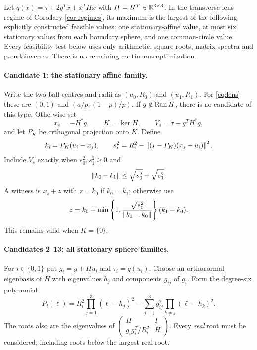 \begin{theorem}\label{thm:fourteen}
Let $q(x)=\tau+2g^Tx+x^THx$ with $H=H^T\in\mathbb R^{3\times3}$.
In the transverse lens regime of Corollary \ref{cor:regimes}, its maximum
is the largest of the following explicitly constructed feasible values:
one stationary-affine value, at most six stationary values from each
boundary sphere, and one common-circle value. Every feasibility test below
uses only arithmetic, square roots, matrix spectra and pseudoinverses.
There is no remaining continuous optimization.
\end{theorem}

\paragraph{Candidate 1: the stationary affine family.}
Write the two ball centres and radii as $(u_0,R_0)$ and $(u_1,R_1)$.
For \eqref{eq:lens} these are $(0,1)$ and $(a/p,(1-p)/p)$.
If $g\notin\operatorname{Ran} H$, there is no candidate of this type. Otherwise set
\[
 x_s=-H^\dagger g,\qquad K=\ker H,
 \qquad V_s=\tau-g^TH^\dagger g,
\]
and let $P_K$ be orthogonal projection onto $K$. Define
\[
 k_i=P_K(u_i-x_s),\qquad
 s_i^2=R_i^2-\left\lVert(I-P_K)(x_s-u_i)\right\rVert^2.
\]
Include $V_s$ exactly when $s_0^2,s_1^2\geq0$ and
\begin{equation}\label{eq:affinefeasible}
 \left\lVert k_0-k_1\right\rVert\leq\sqrt{s_0^2}+\sqrt{s_1^2}.
\end{equation}
A witness is $x_s+z$ with $z=k_0$ if $k_0=k_1$; otherwise use
\[
 z=k_0+\min\left\{1,\frac{\sqrt{s_0^2}}{\left\lVert k_1-k_0\right\rVert}\right\}(k_1-k_0).
\]
This remains valid when $K=\{0\}$.

\paragraph{Candidates 2--13: all stationary sphere families.}
For $i\in\{0,1\}$ put $g_i=g+Hu_i$ and $\tau_i=q(u_i)$.
Choose an orthonormal eigenbasis of $H$ with eigenvalues $h_j$ and
components $g_{ij}$ of $g_i$. Form the degree-six polynomial
\begin{equation}\label{eq:lenspoly}
 P_i(\ell)=R_i^2\prod_{j=1}^3(\ell-h_j)^2
    -\sum_{j=1}^3g_{ij}^2\prod_{k\ne j}(\ell-h_k)^2.
\end{equation}
The roots also are the eigenvalues of
$\left(\begin{smallmatrix}H&I\\g_ig_i^T/R_i^2&H\end{smallmatrix}\right)$.
Every \emph{real} root must be considered, including roots below the
largest real root.


